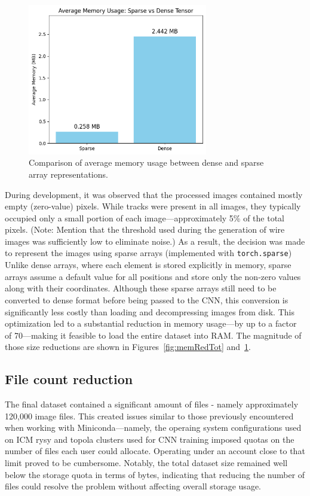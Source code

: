 \documentclass{pracalicmgr}
\begin{document}
\begin{figure}[H]
    \centering
    \includegraphics[width=0.7\textwidth]{src/sparseDenseComp.png}
    \caption{Comparison of average memory usage between dense and sparse array representations.}
    \label{fig:memRedAvg}
\end{figure}

During development, it was observed that the processed images contained mostly empty (zero-value) pixels. While tracks were present in all images, they typically occupied only a small portion of each image—approximately 5\% of the total pixels. (Note: Mention that the threshold used during the generation of wire images was sufficiently low to eliminate noise.) As a result, the decision was made to represent the images using sparse arrays (implemented with \texttt{torch.sparse}) Unlike dense arrays, where each element is stored explicitly in memory, sparse arrays assume a default value for all positions and store only the non-zero values along with their coordinates. Although these sparse arrays still need to be converted to dense format before being passed to the CNN, this conversion is significantly less costly than loading and decompressing images from disk. This optimization led to a substantial reduction in memory usage—by up to a factor of 70—making it feasible to load the entire dataset into RAM. The magnitude of those size reductions are shown in Figures~\ref{fig:memRedTot} and~\ref{fig:memRedAvg}.
\subsection{File count reduction}

The final dataset contained a significant amount of files - namely approximately 120,000 image files. This created issues similar to those previously encountered when working with Miniconda—namely, the operaing system configurations used on ICM rysy and topola clusters used for CNN training imposed quotas on the number of files each user could allocate. Operating under an account close to that limit proved to be cumbersome. Notably, the total dataset size remained well below the storage quota in terms of bytes, indicating that reducing the number of files could resolve the problem without affecting overall storage usage.
\end{document}
